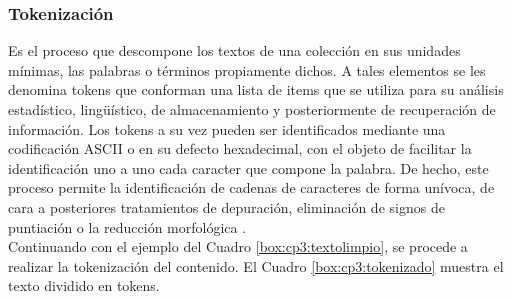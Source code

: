 \subsubsection{Tokenización}

Es el proceso que descompone los textos de una colección en sus unidades mínimas, las palabras
o términos propiamente dichos. A tales elementos se les denomina tokens que conforman una lista de
items que se utiliza para su análisis estadístico, ling{\"u}ístico, de almacenamiento y posteriormente de
recuperación de información. Los tokens a su vez pueden ser identificados mediante una codificación
ASCII o en su defecto hexadecimal, con el objeto de facilitar la identificación uno a uno cada caracter
que compone la palabra. De hecho, este proceso permite la identificación de cadenas de caracteres de
forma unívoca, de cara a posteriores tratamientos de depuración, eliminación de signos de puntiación
o la reducción morfológica \citep{CT12}.\\

Continuando con el ejemplo del Cuadro \ref{box:cp3:textolimpio}, se procede a realizar la tokenización del contenido. El Cuadro \ref{box:cp3:tokenizado} muestra el texto dividido en tokens.\\

